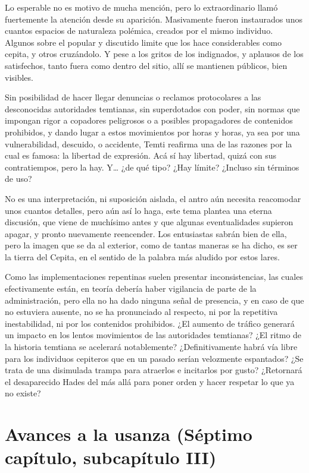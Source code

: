 \documentclass[
  spanish,
]{book}
\begin{document}
Lo esperable no es motivo de mucha mención, pero lo extraordinario llamó fuertemente la atención desde su aparición. Masivamente fueron instaurados unos cuantos espacios de naturaleza polémica, creados por el mismo individuo. Algunos sobre el popular y discutido limite que los hace considerables como cepita, y otros cruzándolo. Y pese a los gritos de los indignados, y aplausos de los satisfechos, tanto fuera como dentro del sitio, allí se mantienen públicos, bien visibles.

Sin posibilidad de hacer llegar denuncias o reclamos protocolares a las desconocidas autoridades temtianas, sin superdotados con poder, sin normas que impongan rigor a copadores peligrosos o a posibles propagadores de contenidos prohibidos, y dando lugar a estos movimientos por horas y horas, ya sea por una vulnerabilidad, descuido, o accidente, Temti reafirma una de las razones por la cual es famosa: la libertad de expresión. Acá sí hay libertad, quizá con sus contratiempos, pero la hay. Y\ldots{} ¿de qué tipo? ¿Hay límite? ¿Incluso sin términos de uso?

No es una interpretación, ni suposición aislada, el antro aún necesita reacomodar unos cuantos detalles, pero aún así lo haga, este tema plantea una eterna discusión, que viene de muchísimo antes y que algunas eventualidades supieron apagar, y pronto nuevamente reencender. Los entusiastas sabrán bien de ella, pero la imagen que se da al exterior, como de tantas maneras se ha dicho, es ser la tierra del Cepita, en el sentido de la palabra más aludido por estos lares.

Como las implementaciones repentinas suelen presentar inconsistencias, las cuales efectivamente están, en teoría debería haber vigilancia de parte de la administración, pero ella no ha dado ninguna señal de presencia, y en caso de que no estuviera ausente, no se ha pronunciado al respecto, ni por la repetitiva inestabilidad, ni por los contenidos prohibidos. ¿El aumento de tráfico generará un impacto en los lentos movimientos de las autoridades temtianas? ¿El ritmo de la historia temtiana se acelerará notablemente? ¿Definitivamente habrá vía libre para los individuos cepiteros que en un pasado serían velozmente espantados? ¿Se trata de una disimulada trampa para atraerlos e incitarlos por gusto? ¿Retornará el desaparecido Hades del más allá para poner orden y hacer respetar lo que ya no existe?

\hypertarget{avances-a-la-usanza-suxe9ptimo-capuxedtulo-subcapuxedtulo-iii}{%
\section{Avances a la usanza (Séptimo capítulo, subcapítulo III)}\label{avances-a-la-usanza-suxe9ptimo-capuxedtulo-subcapuxedtulo-iii}}
\end{document}
